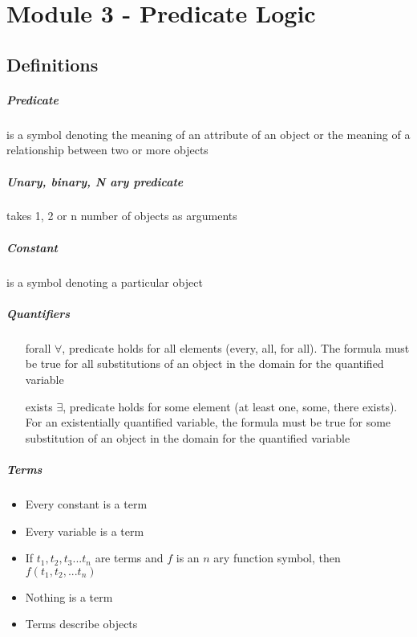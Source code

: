 \chapter{Module 3 - Predicate Logic}
  \section{Definitions}
    \paragraph{Predicate} is a symbol denoting the meaning of an attribute of
    an object or the meaning of a relationship between two or more objects

    \paragraph{Unary, binary, N ary predicate} takes 1, 2 or n number of
    objects as arguments

    \paragraph{Constant} is a symbol denoting a particular object

    \paragraph{Quantifiers}
      \begin{itemize}
        \item[forall] $ \forall $, predicate holds for all elements (every,
        all, for all). The formula must be true for all substitutions of an
        object in the domain for the quantified variable
        \item[exists] $ \exists $, predicate holds for some element (at least
        one, some, there exists). For an existentially quantified variable,
        the formula must be true for some substitution of an object in the
        domain for the quantified variable
      \end{itemize}

    \paragraph{Terms}
      \begin{itemize}
        \item Every constant is a term
        \item Every variable is a term
        \item If $t_1, t_2, t_3 ... t_n$ are terms and $f$ is an $n$ ary
        function symbol, then $f(t_1, t_2, ... t_n)$
        \item Nothing is a term
        \item Terms describe objects
      \end{itemize}

